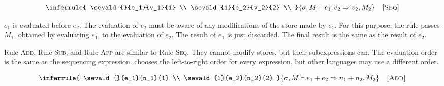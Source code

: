 
\vspace{-1em}

\[
  \inferrule
  {
    \sevald{}{e_1}{v_1}{1} \\
    \sevald{1}{e_2}{v_2}{2} \\
  }
  { \sevald{}{\eseq{e_1}{e_2}}{v_2}{2} }
  \quad\textsc{[Seq]}
\]

$e_1$ is evaluated before $e_2$. The evaluation of $e_2$ must be aware of
any modifications of the store made by $e_1$.
For this purpose, the rule passes $M_1$, obtained by evaluating
$e_1$, to the evaluation of $e_2$. The result of $e_1$ is just discarded.
The final result is the same as the result of $e_2$.

Rule \textsc{Add}, Rule \textsc{Sub}, and Rule \textsc{App} are similar to
Rule \textsc{Seq}. They cannot modify stores, but their subexpressions can. The
evaluation order is the same as the sequencing expression. \Lang chooses
the left-to-right order for every expression, but other languages
may use a different order.


\vspace{-1em}

\[
  \inferrule
  {
    \sevald{}{e_1}{n_1}{1} \\
    \sevald{1}{e_2}{n_2}{2}
  }
  { \sevald{}{\eadd{e_1}{e_2}}{n_1+n_2}{2} }
  \quad\textsc{[Add]}
\]

\vspace{-1em}


